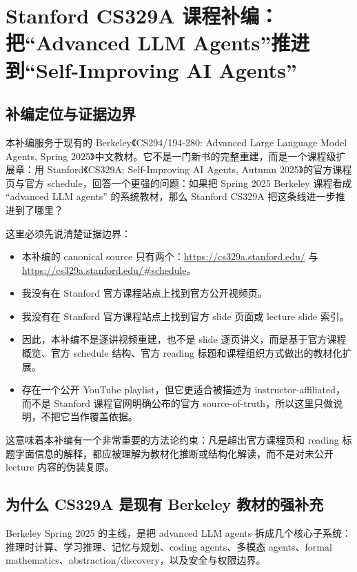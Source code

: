 \chapter{Stanford CS329A 课程补编：把“Advanced LLM Agents”推进到“Self-Improving AI Agents”}

\section{补编定位与证据边界}

本补编服务于现有的 Berkeley《CS294/194-280: Advanced Large Language Model Agents, Spring 2025》中文教材。它不是一门新书的完整重建，而是一个课程级扩展章：用 Stanford《CS329A: Self-Improving AI Agents, Autumn 2025》的官方课程页与官方 schedule，回答一个更强的问题：如果把 Spring 2025 Berkeley 课程看成 ``advanced LLM agents'' 的系统教材，那么 Stanford CS329A 把这条线进一步推进到了哪里？

这里必须先说清楚证据边界：
\begin{itemize}
\item 本补编的 canonical source 只有两个：\url{https://cs329a.stanford.edu/} 与 \url{https://cs329a.stanford.edu/#schedule}。
\item 我没有在 Stanford 官方课程站点上找到官方公开视频页。
\item 我没有在 Stanford 官方课程站点上找到官方 slide 页面或 lecture slide 索引。
\item 因此，本补编不是逐讲视频重建，也不是 slide 逐页讲义，而是基于官方课程概览、官方 schedule 结构、官方 reading 标题和课程组织方式做出的教材化扩展。
\item 存在一个公开 YouTube playlist，但它更适合被描述为 instructor-affiliated，而不是 Stanford 课程官网明确公布的官方 source-of-truth，所以这里只做说明，不把它当作覆盖依据。
\end{itemize}

这意味着本补编有一个非常重要的方法论约束：凡是超出官方课程页和 reading 标题字面信息的解释，都应被理解为教材化推断或结构化解读，而不是对未公开 lecture 内容的伪装复原。

\section{为什么 CS329A 是现有 Berkeley 教材的强补充}

Berkeley Spring 2025 的主线，是把 advanced LLM agents 拆成几个核心子系统：推理时计算、学习推理、记忆与规划、coding agents、多模态 agents、formal mathematics、abstraction/discovery，以及安全与权限边界。

